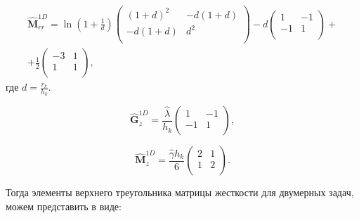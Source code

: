 \begin{equation} \label{eq_2_15}
\begin{gathered}
	\hat{\textbf{M}}_{rr}^{1D} = \ln\left(1 + \frac{1}{d}\right)
	\left(
	\begin{array}{cc}
		(1+d)^2 & -d(1+d)\\
		-d(1+d) &  d^2\\
	\end{array}
	\right)
	-d
	\left(
	\begin{array}{rr}
		1 & -1\\
		-1 & 1\\
	\end{array}
	\right) + \\
	+ \frac{1}{2}
	\left(
	\begin{array}{rr}
		-3 & 1\\
		1 & 1\\
	\end{array}
	\right),
\end{gathered}
\end{equation}
где $d = \frac{r_k}{h_k}$.


\begin{equation} \label{eq_2_16}
	\hat{\textbf{G}}_z^{1D} = \frac{\hat{\lambda}}{h_k} \left(
	\begin{array}{rr}
		1 & -1\\
		-1 &  1\\
	\end{array}
	\right),
\end{equation}

\begin{equation} \label{eq_2_17}
	\hat{\textbf{M}}_z^{1D} = \frac{\hat{\gamma} h_k}{6} \left(
	\begin{array}{rr}
		2 & 1\\
		1 & 2\\
	\end{array}
	\right).
\end{equation}

Тогда элементы верхнего треугольника матрицы жесткости для двумерных задач, можем представить в виде:

